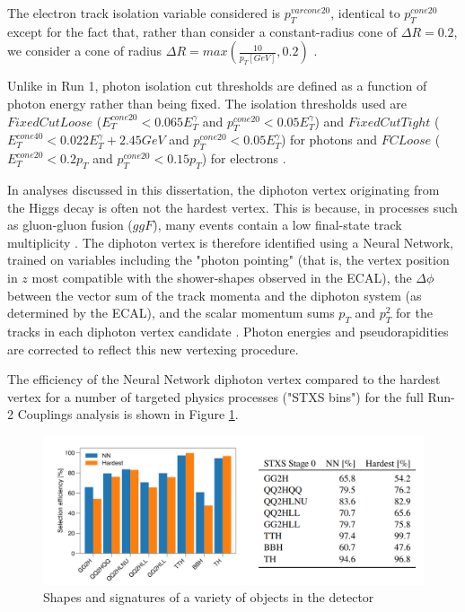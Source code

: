 The electron track isolation variable considered is $p_{T}^{varcone20}$, identical to $p_{T}^{cone20}$ except for the fact that, rather than consider a constant-radius cone of $\Delta R = 0.2$, we consider a cone of radius $\Delta R = max(\frac{10}{p_{T}[GeV]}, 0.2)$ \cite{CERN-EP-2019-145}.

Unlike in Run 1, photon isolation cut thresholds are defined as a function of photon energy rather than being fixed. The isolation thresholds used are $FixedCutLoose$ ($E_{T}^{cone20}< 0.065 E_{T}^{\gamma}$ and $p_{T}^{cone20} < 0.05 E_{T}^{\gamma}$) and $FixedCutTight$ ($E_{T}^{cone40}< 0.022 E_{T}^{\gamma} + 2.45 GeV$ and $p_{T}^{cone20} < 0.05 E_{T}^{\gamma}$) for photons and $FCLoose$ ($E_{T}^{cone20}< 0.2 p_{T}$ and $p_{T}^{cone20} < 0.15 p_{T}$) for electrons \cite{ATL-COM-PHYS-2020-378}.

In analyses discussed in this dissertation, the diphoton vertex originating from the Higgs decay is often not the hardest vertex. This is because, in processes such as gluon-gluon fusion ($ggF$), many events contain a low final-state track multiplicity \cite{1408.7084}. The diphoton vertex is therefore identified using a Neural Network, trained on variables including the "photon pointing" (that is, the vertex position in $z$ most compatible with the shower-shapes observed in the ECAL), the $\Delta \phi$ between the vector sum of the track momenta and the diphoton system (as determined by the ECAL), and the scalar momentum sums $p_{T}$ and $p_{T}^2$ for the tracks in each diphoton vertex candidate \cite{ATL-COM-PHYS-2020-378}. Photon energies and pseudorapidities are corrected to reflect this new vertexing procedure.

The efficiency of the Neural Network diphoton vertex compared to the hardest vertex for a number of targeted physics processes ("STXS bins") for the full Run-2 Couplings analysis is shown in Figure \ref{fig:Vertexing}.

\begin{figure}
  \includegraphics[width=\linewidth]{figures/methods_chapter/Vertexing.png}
  \caption{Shapes and signatures of a variety of objects in the detector \cite{ATL-COM-PHYS-2020-378}}
  \label{fig:Vertexing}
\end{figure}

